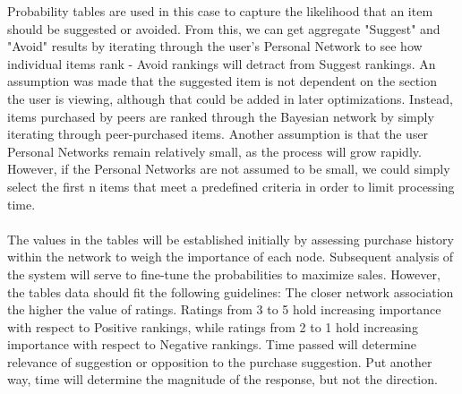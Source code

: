 \documentclass[12pt,a4paper]{article}
\begin{document}
		Probability tables are used in this case to capture the likelihood that an item should be suggested or avoided. From this, we can get aggregate "Suggest" and "Avoid" results by iterating through the user's Personal Network to see how individual items rank - Avoid rankings will detract from Suggest rankings. An assumption was made that the suggested item is not dependent on the section the user is viewing, although that could be added in later optimizations. Instead, items purchased by peers are ranked through the Bayesian network by simply iterating through peer-purchased items. Another assumption is that the user Personal Networks remain relatively small, as the process will grow rapidly. However, if the Personal Networks are not assumed to be small, we could simply select the first n items that meet a predefined criteria in order to limit processing time.    
		\\\\
		The values in the tables will be established initially by assessing purchase history within the network to weigh the importance of each node. Subsequent analysis of the system will serve to fine-tune the probabilities to maximize sales. However, the tables data should fit the following guidelines: The closer network association the higher the value of ratings. Ratings from 3 to 5 hold increasing importance with respect to Positive rankings, while ratings from 2 to 1 hold increasing importance with respect to Negative rankings.  Time passed will determine relevance of suggestion or opposition to the purchase suggestion. Put another way, time will determine the magnitude of the response, but not the direction. 
		\\\\
\end{document}
